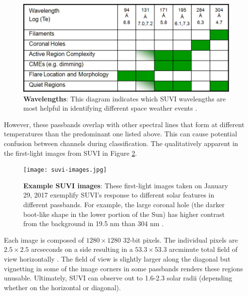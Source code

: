 \documentclass[twoside]{report}
\begin{document}
\begin{figure}[ht]
  \begin{center}
    \includegraphics[scale=0.4]{suvi-wavelength-log.jpg}
    \caption{{\bf Wavelengths}: This diagram indicates which SUVI wavelengths are most helpful in identifying different space weather events \cite{suviwebsite}.}
    \label{fig:suviwavelength}
 \end{center}
\end{figure}

However, these passbands overlap with other spectral lines that form at different temperatures than the predominant one listed above. This can cause potential confusion between channels during classification. The qualitatively apparent in the first-light images from SUVI in Figure \ref{fig:suviimages}.

\begin{figure}[ht]
  \begin{center}
    \texttt{[image: suvi-images.jpg]}
    \caption{{\bf Example SUVI images}: These first-light images taken on January 29, 2017 exemplify SUVI's response to different solar features in different passbands. For example, the large coronal hole (the darker boot-like shape in the lower portion of the Sun) has higher contrast from the background in 19.5 nm than 304 nm \cite{suviwebsite}.}
    \label{fig:suviimages}
 \end{center}
\end{figure}


Each image is composed of $1280\times1280$ 32-bit pixels. The individual pixels are $2.5\times2.5$ arcseconds on a side resulting in a $53.3 \times 53.3$ arcminute total field of view horizontally \cite{suvibg2}. The field of view is slightly larger along the diagonal but vignetting in some of the image corners in some passbands renders these regions unusable. Ultimately, SUVI can observe out to 1.6-2.3 solar radii (depending whether on the horizontal or diagonal). 
\end{document}
